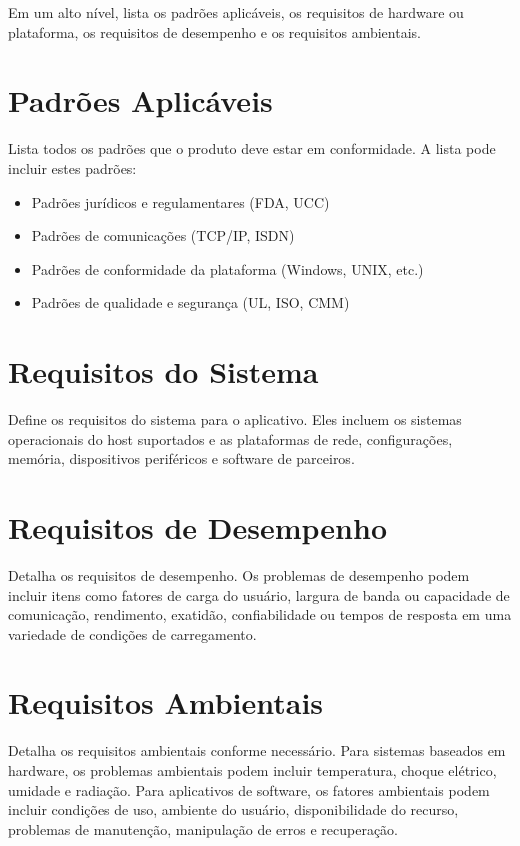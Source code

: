 \documentclass{report}
\begin{document}
Em um alto nível, lista os padrões aplicáveis, os requisitos de hardware ou
plataforma, os requisitos de desempenho e os requisitos ambientais.

\section{Padrões Aplicáveis}

Lista todos os padrões que o produto deve estar em conformidade. A lista pode
incluir estes padrões:

\begin{itemize}
	\item
	      Padrões jurídicos e regulamentares (FDA, UCC)

	\item
	      Padrões de comunicações (TCP/IP, ISDN)

	\item
	      Padrões de conformidade da plataforma (Windows, UNIX, etc.)

	\item
	      Padrões de qualidade e segurança (UL, ISO, CMM)
\end{itemize}

\section{Requisitos do Sistema}

Define os requisitos do sistema para o aplicativo. Eles incluem os sistemas
operacionais do host suportados e as plataformas de rede, configurações,
memória, dispositivos periféricos e software de parceiros.

\section{Requisitos de Desempenho}

Detalha os requisitos de desempenho. Os problemas de desempenho podem incluir
itens como fatores de carga do usuário, largura de banda ou capacidade de
comunicação, rendimento, exatidão, confiabilidade ou tempos de resposta em uma
variedade de condições de carregamento.

\section{Requisitos Ambientais}

Detalha os requisitos ambientais conforme necessário. Para sistemas baseados em
hardware, os problemas ambientais podem incluir temperatura, choque elétrico,
umidade e radiação. Para aplicativos de software, os fatores ambientais podem
incluir condições de uso, ambiente do usuário, disponibilidade do recurso,
problemas de manutenção, manipulação de erros e recuperação.
\end{document}
